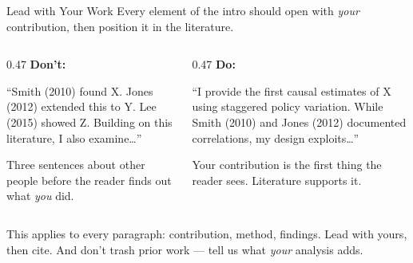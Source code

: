 \begin{frame}{Lead with Your Work}
  Every element of the intro should open with \emph{your} contribution, then position it in the literature.

  \vspace{8pt}

  \begin{columns}[T]
    \begin{column}{0.47\textwidth}
      \textbf{\textcolor{red!60}{Don't:}}

      \vspace{2pt}

      ``Smith (2010) found X. Jones (2012) extended this to Y. Lee (2015) showed Z. Building on this literature, I also examine\ldots''

      \vspace{4pt}

      {\scriptsize Three sentences about other people before the reader finds out what \emph{you} did.}
    \end{column}
    \begin{column}{0.47\textwidth}
      \textbf{\textcolor{usfgreen}{Do:}}

      \vspace{2pt}

      ``I provide the first causal estimates of X using staggered policy variation. While Smith (2010) and Jones (2012) documented correlations, my design exploits\ldots''

      \vspace{4pt}

      {\scriptsize Your contribution is the first thing the reader sees. Literature supports it.}
    \end{column}
  \end{columns}

  \vspace{8pt}

  This applies to every paragraph: contribution, method, findings. Lead with yours, then cite. And don't trash prior work --- tell us what \emph{your} analysis adds.
\end{frame}

